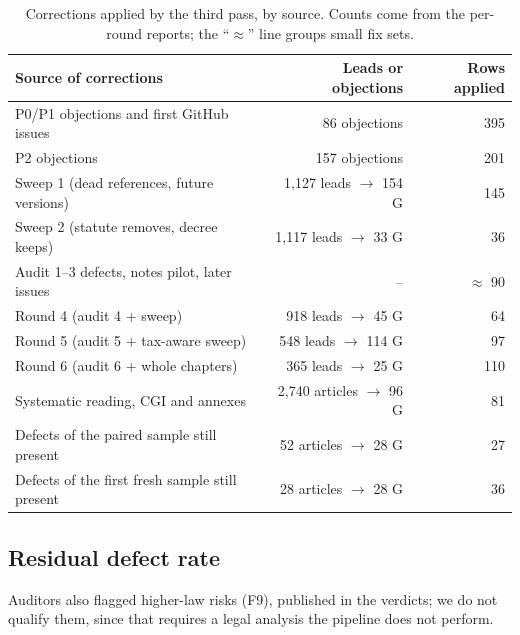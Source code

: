 \documentclass[11pt,a4paper]{article}
\begin{document}
\begin{table}[ht]
\centering
\small
\begin{tabularx}{\linewidth}{Xrr}
\toprule
Source of corrections & Leads or objections & Rows applied\\
\midrule
P0/P1 objections and first GitHub issues & 86 objections & 395\\
P2 objections & 157 objections & 201\\
Sweep 1 (dead references, future versions) & 1{,}127 leads $\rightarrow$ 154 G & 145\\
Sweep 2 (statute removes, decree keeps) & 1{,}117 leads $\rightarrow$ 33 G & 36\\
Audit 1--3 defects, notes pilot, later issues & -- & $\approx$ 90\\
Round 4 (audit 4 + sweep) & 918 leads $\rightarrow$ 45 G & 64\\
Round 5 (audit 5 + tax-aware sweep) & 548 leads $\rightarrow$ 114 G & 97\\
Round 6 (audit 6 + whole chapters) & 365 leads $\rightarrow$ 25 G & 110\\
Systematic reading, CGI and annexes & 2{,}740 articles $\rightarrow$ 96 G & 81\\
Defects of the paired sample still present & 52 articles $\rightarrow$ 28 G & 27\\
Defects of the first fresh sample still present & 28 articles $\rightarrow$ 28 G & 36\\
\bottomrule
\end{tabularx}
\caption{Corrections applied by the third pass, by source. Counts come from the per-round reports; the ``$\approx$'' line groups small fix sets.}
\label{tab:rounds}
\end{table}

\subsection{Residual defect rate}
Auditors also flagged higher-law risks (F9), published in the verdicts; we do not qualify them, since that requires a legal analysis the pipeline does not perform.
\end{document}
